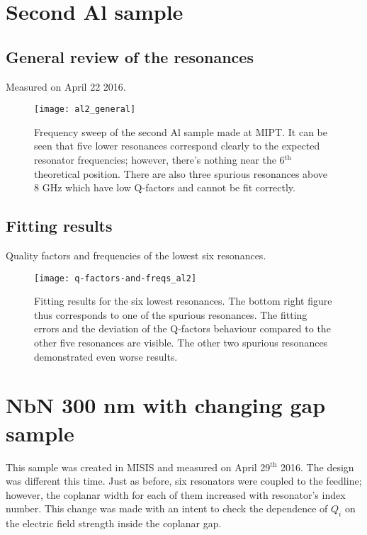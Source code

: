 \documentclass[12pt]{article}
\numberwithin{equation}{section}
\numberwithin{figure}{section}
\begin{document}
\section{Second Al sample}

\subsection{General review of the resonances}

Measured on April 22 2016.

\begin{figure}[h]
\centering
\texttt{[image: al2\_general]}
\caption{Frequency sweep of the second Al sample made at MIPT. It can be seen that five lower resonances correspond clearly to the expected resonator frequencies; however, there's nothing near the 6$^{\text{th}}$ theoretical position. There are also three spurious resonances above 8 GHz which have low Q-factors and cannot be fit correctly.}
\end{figure}

\subsection{Fitting results}

Quality factors and frequencies of the lowest six resonances.

\begin{figure}[h]
\centering
\texttt{[image: q-factors-and-freqs\_al2]}
\caption{Fitting results for the six lowest resonances. The bottom right figure thus corresponds to one of the spurious resonances. The fitting errors and the deviation of the Q-factors behaviour compared to the other five resonances are visible. The other two spurious resonances demonstrated even worse results.}
\end{figure}

\section{NbN 300 nm with changing gap sample}

This sample was created in MISIS and measured on April 29$^\text{th}$ 2016. The design was different this time. Just as before, six resonators were coupled to the feedline; however, the coplanar width for each of them increased with resonator's index number. This change was made with an intent to check the dependence of $Q_i$ on the electric field strength inside the coplanar gap.
\end{document}
